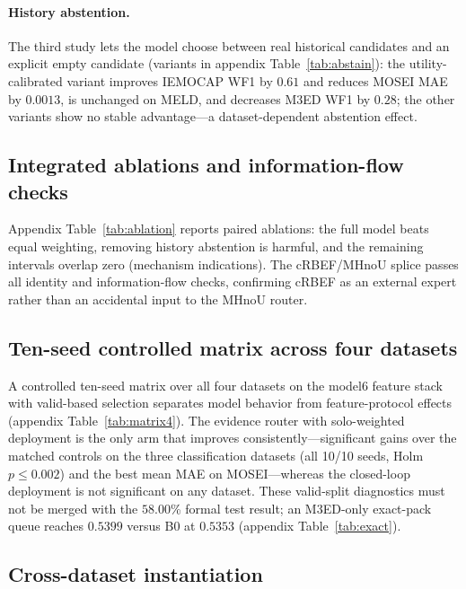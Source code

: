 \documentclass[10pt,twocolumn,letterpaper]{article}
\begin{document}
\paragraph{History abstention.}
The third study lets the model choose between real historical candidates and an explicit empty candidate (variants in appendix Table~\ref{tab:abstain}): the utility-calibrated variant improves IEMOCAP WF1 by $0.61$ and reduces MOSEI MAE by $0.0013$, is unchanged on MELD, and decreases M3ED WF1 by $0.28$; the other variants show no stable advantage---a dataset-dependent abstention effect.

\subsection{Integrated ablations and information-flow checks}
\label{sec:ablation}




Appendix Table~\ref{tab:ablation} reports paired ablations: the full model beats equal weighting, removing history abstention is harmful, and the remaining intervals overlap zero (mechanism indications).
The cRBEF/MHnoU splice passes all identity and information-flow checks, confirming cRBEF as an external expert rather than an accidental input to the MHnoU router.

\subsection{Ten-seed controlled matrix across four datasets}
\label{sec:exact}



A controlled ten-seed matrix over all four datasets on the model6 feature stack with valid-based selection separates model behavior from feature-protocol effects (appendix Table~\ref{tab:matrix4}).
The evidence router with solo-weighted deployment is the only arm that improves consistently---significant gains over the matched controls on the three classification datasets (all 10/10 seeds, Holm $p{\le}0.002$) and the best mean MAE on MOSEI---whereas the closed-loop deployment is not significant on any dataset.
These valid-split diagnostics must not be merged with the $58.00$\% formal test result; an M3ED-only exact-pack queue reaches $0.5399$ versus B0 at $0.5353$ (appendix Table~\ref{tab:exact}).

\subsection{Cross-dataset instantiation}
\label{sec:transfer}
\end{document}
